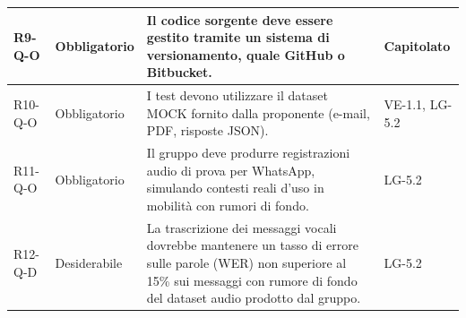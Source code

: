 {\begin{longtable}{|>{\raggedright\arraybackslash}p{1.8cm}|>{\raggedright\arraybackslash}p{2.3cm}|>{\raggedright\arraybackslash}p{6.6cm}|>{\raggedright\arraybackslash}p{3.1cm}|}
    \mbox{R9-Q-O} & Obbligatorio & Il codice sorgente deve essere gestito tramite un sistema di versionamento, quale GitHub o Bitbucket. & \mbox{Capitolato} \\ \hline
    \mbox{R10-Q-O} & Obbligatorio & I test devono utilizzare il dataset MOCK fornito dalla proponente (e-mail, PDF, risposte JSON). & \mbox{VE-1.1}, \mbox{LG-5.2} \\ \hline
    \mbox{R11-Q-O} & Obbligatorio & Il gruppo deve produrre registrazioni audio di prova per WhatsApp, simulando contesti reali d'uso in mobilità con rumori di fondo. & \mbox{LG-5.2} \\ \hline
    \mbox{R12-Q-D} & Desiderabile & La trascrizione dei messaggi vocali dovrebbe mantenere un tasso di errore sulle parole (WER) non superiore al 15\% sui messaggi con rumore di fondo del dataset audio prodotto dal gruppo. & \mbox{LG-5.2} \\ \hline
    \end{longtable}
}
